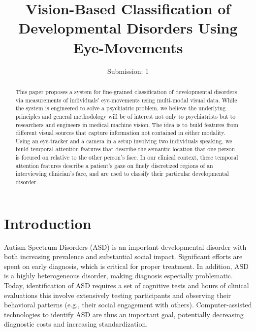 \documentclass{llncs}
\begin{document}
  \title{Vision-Based Classification of Developmental Disorders Using Eye-Movements}
  \author{Submission: 1}
  \institute{}


  \maketitle

  \begin{abstract}
    This paper proposes a system for fine-grained classification of developmental disorders via measurements of individuals' eye-movements using multi-modal visual data. While the system is engineered to solve a psychiatric problem, we believe the underlying principles and general methodology will be of interest not only to psychiatrists but to researchers and engineers in medical machine vision. The idea is to build features from different visual sources that capture information not contained in either modality. Using an eye-tracker and a camera in a setup involving two individuals speaking, we build temporal attention features that describe the semantic location that one person is focused on relative to the other person's face. In our clinical context, these temporal attention features describe a patient's gaze on finely discretized regions of an interviewing clinician's face, and are used to classify their particular developmental disorder.
  \end{abstract}

  \vspace{-2.5em}
  \section{Introduction}
  \vspace{-1em}
  Autism Spectrum Disorders (ASD) is an important developmental disorder with both increasing prevalence and substantial social impact. Significant efforts are spent on early diagnosis, which is critical for proper treatment. In addition, ASD is a highly heterogeneous disorder, making diagnosis especially problematic. Today, identification of ASD requires a set of cognitive tests and hours of clinical evaluations this involve extensively testing participants and observing their behavioral patterns (e.g., their social engagement with others). Computer-assisted technologies to identify ASD are thus an important goal, potentially decreasing diagnostic costs and increasing standardization.
\end{document}
